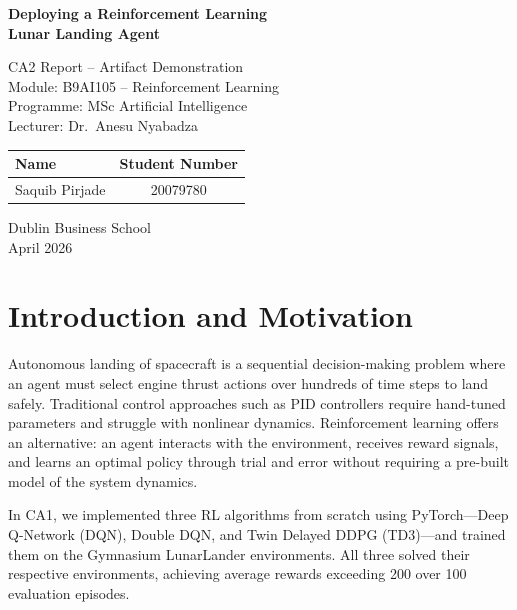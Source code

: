 \documentclass[11pt,a4paper]{article}
\begin{document}
\begin{titlepage}
\centering
\vspace*{2cm}

{\huge\bfseries Deploying a Reinforcement Learning\\[0.3cm] Lunar Landing Agent\\[1.5cm]}

{\Large CA2 Report -- Artifact Demonstration\\[0.5cm]}
{\large Module: B9AI105 -- Reinforcement Learning\\[0.3cm]}
{\large Programme: MSc Artificial Intelligence\\[0.3cm]}
{\large Lecturer: Dr.\ Anesu Nyabadza\\[2cm]}

\begin{tabular}{lc}
\toprule
\textbf{Name} & \textbf{Student Number} \\
\midrule
Saquib Pirjade & 20079780 \\
\bottomrule
\end{tabular}

\vfill
{\large Dublin Business School\\[0.3cm]}
{\large April 2026}
\end{titlepage}

\tableofcontents
\newpage

\section{Introduction and Motivation}

Autonomous landing of spacecraft is a sequential decision-making problem where an agent must select engine thrust actions over hundreds of time steps to land safely. Traditional control approaches such as PID controllers require hand-tuned parameters and struggle with nonlinear dynamics. Reinforcement learning offers an alternative: an agent interacts with the environment, receives reward signals, and learns an optimal policy through trial and error without requiring a pre-built model of the system dynamics.

In CA1, we implemented three RL algorithms from scratch using PyTorch---Deep Q-Network (DQN), Double DQN, and Twin Delayed DDPG (TD3)---and trained them on the Gymnasium LunarLander environments. All three solved their respective environments, achieving average rewards exceeding 200 over 100 evaluation episodes.
\end{document}
